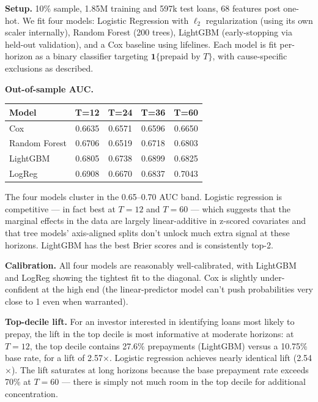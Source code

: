 \documentclass[11pt,a4paper]{article}
\begin{document}
\textbf{Setup.} 10\% sample, 1.85M training and 597k test loans, 68 features post one-hot. We fit four models: Logistic Regression with $\ell_2$ regularization (using its own scaler internally), Random Forest (200 trees), LightGBM (early-stopping via held-out validation), and a Cox baseline using lifelines. Each model is fit per-horizon as a binary classifier targeting $\mathbf{1}\{\text{prepaid by } T\}$, with cause-specific exclusions as described.

\textbf{Out-of-sample AUC.}

\begin{center}
  \small
  \begin{tabular}{lcccc}
    \toprule
    Model         & T=12   & T=24   & T=36   & T=60   \\
    \midrule
    Cox           & 0.6635 & 0.6571 & 0.6596 & 0.6650 \\
    Random Forest & 0.6706 & 0.6519 & 0.6718 & 0.6803 \\
    LightGBM      & 0.6805 & 0.6738 & 0.6899 & 0.6825 \\
    LogReg        & 0.6908 & 0.6670 & 0.6837 & 0.7043 \\
    \bottomrule
  \end{tabular}
\end{center}

The four models cluster in the 0.65--0.70 AUC band. Logistic regression is competitive --- in fact best at $T{=}12$ and $T{=}60$ --- which suggests that the marginal effects in the data are largely linear-additive in z-scored covariates and that tree models' axis-aligned splits don't unlock much extra signal at these horizons. LightGBM has the best Brier scores and is consistently top-2.

\textbf{Calibration.} All four models are reasonably well-calibrated, with LightGBM and LogReg showing the tightest fit to the diagonal. Cox is slightly under-confident at the high end (the linear-predictor model can't push probabilities very close to 1 even when warranted).

\textbf{Top-decile lift.} For an investor interested in identifying loans most likely to prepay, the lift in the top decile is most informative at moderate horizons: at $T{=}12$, the top decile contains 27.6\% prepayments (LightGBM) versus a 10.75\% base rate, for a lift of 2.57$\times$. Logistic regression achieves nearly identical lift (2.54$\times$). The lift saturates at long horizons because the base prepayment rate exceeds 70\% at $T{=}60$ --- there is simply not much room in the top decile for additional concentration.
\end{document}
